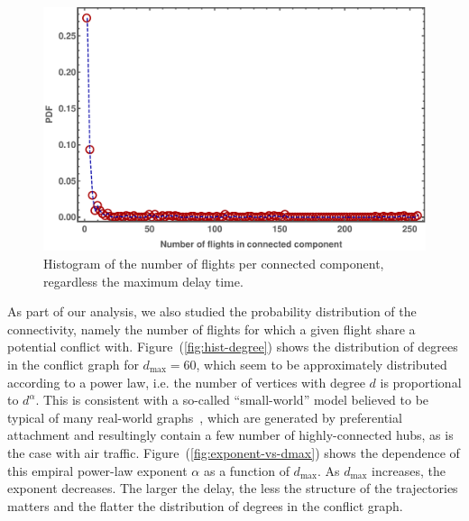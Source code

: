 \begin{figure}[h]
\includegraphics[width=\columnwidth]{pics/instances/analysis_cc.pdf}
\caption[Histogram of connected component sizes]{Histogram of the number of flights per connected component, regardless the maximum delay time.}
\label{fig:hist-CC-sizes}
\end{figure}

As part of our analysis, we also studied the probability
distribution of the connectivity, namely the number of flights
for which a given flight share a potential conflict with. 
Figure~(\ref{fig:hist-degree}) shows
the distribution of degrees in the conflict graph for $d_{\max}=60$,
which seem to be approximately distributed according to a power law, i.e. 
the number of vertices with degree $d$ is proportional to $d^{\alpha}$.
This is consistent with a so-called ``small-world'' model believed to be typical of many real-world graphs~\cite{barabasi:99}, which are generated by preferential attachment and resultingly contain a few number of highly-connected hubs, as is the case with air traffic.
Figure~(\ref{fig:exponent-vs-dmax}) shows the dependence of this empiral power-law exponent $\alpha$ as a function of $d_{\max}$.
As $d_{\max}$ increases, the exponent decreases.
The larger the delay, the less the structure of the trajectories matters and the flatter the distribution of degrees in the conflict graph.

